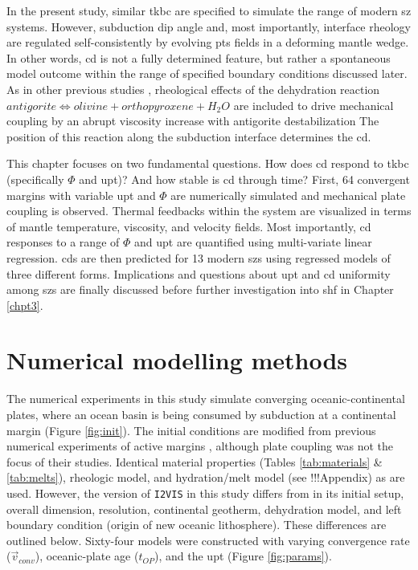 In the present study, similar \gls{tkbc} are specified to simulate the range of modern \gls{sz} systems. However, subduction dip angle and, most importantly, interface rheology are regulated self-consistently by evolving \gls{pts} fields in a deforming mantle wedge. In other words, \gls{cd} is not a fully determined feature, but rather a spontaneous model outcome within the range of specified boundary conditions discussed later. As in other previous studies \citep[e.g.,][]{Ruh2015}, rheological effects of the dehydration reaction \(antigorite \allowbreak \Leftrightarrow olivine + orthopyroxene + H_{2}O\) are included to drive mechanical coupling by an abrupt viscosity increase with antigorite destabilization The position of this reaction along the subduction interface determines the \gls{cd}.

This chapter focuses on two fundamental questions. How does \gls{cd} respond to \gls{tkbc} (specifically \(\Phi\) and \gls{upt})? And how stable is \gls{cd} through time? First, 64 convergent margins with variable \gls{upt} and \(\Phi\) are numerically simulated and mechanical plate coupling is observed. Thermal feedbacks within the system are visualized in terms of mantle temperature, viscosity, and velocity fields. Most importantly, \gls{cd} responses to a range of \(\Phi\) and \gls{upt} are quantified using multi-variate linear regression. \glspl{cd} are then predicted for 13 modern \glspl{sz} using regressed models of three different forms. Implications and questions about \gls{upt} and \gls{cd} uniformity among \glspl{sz} are finally discussed before further investigation into \gls{shf} in Chapter \ref{chpt3}.

\hypertarget{numerical-modelling-methods}{%
\section{Numerical modelling methods}\label{numerical-modelling-methods}}

The numerical experiments in this study simulate converging oceanic-continental plates, where an ocean basin is being consumed by subduction at a continental margin (Figure \ref{fig:init}). The initial conditions are modified from previous numerical experiments of active margins \citep[code: \texttt{I2VIS},][]{Sizova2010, Gorczyk2007}, although plate coupling was not the focus of their studies. Identical material properties (Tables \ref{tab:materials} \& \ref{tab:melts}), rheologic model, and hydration/melt model (see !!!Appendix) as \citet{Sizova2010} are used. However, the version of \texttt{I2VIS} in this study differs from \citet{Sizova2010} in its initial setup, overall dimension, resolution, continental geotherm, dehydration model, and left boundary condition (origin of new oceanic lithosphere). These differences are outlined below. Sixty-four models were constructed with varying convergence rate (\(\vec{v}_{conv}\)), oceanic-plate age (\(t_{OP}\)), and the \gls{upt} (Figure \ref{fig:params}).

